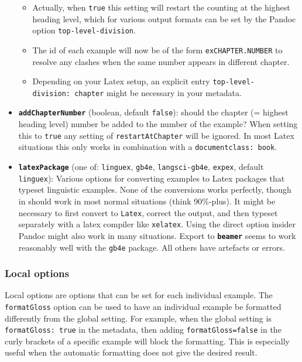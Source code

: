\documentclass[
]{article}
\providecommand{\tightlist}{%
  \setlength{\itemsep}{0pt}\setlength{\parskip}{0pt}}
\begin{document}
\begin{itemize}
  \begin{itemize}
  \tightlist
  \item
    Actually, when \texttt{true} this setting will restart the counting
    at the highest heading level, which for various output formats can
    be set by the Pandoc option \texttt{top-level-division}.
  \item
    The id of each example will now be of the form
    \texttt{exCHAPTER.NUMBER} to resolve any clashes when the same
    number appears in different chapter.
  \item
    Depending on your Latex setup, an explicit entry
    \texttt{top-level-division:\ chapter} might be necessary in your
    metadata.
  \end{itemize}
\item
  \textbf{\texttt{addChapterNumber}} (boolean, default \texttt{false}):
  should the chapter (= highest heading level) number be added to the
  number of the example? When setting this to \texttt{true} any setting
  of \texttt{restartAtChapter} will be ignored. In most Latex situations
  this only works in combination with a \texttt{documentclass:\ book}.
\item
  \textbf{\texttt{latexPackage}} (one of: \texttt{linguex},
  \texttt{gb4e}, \texttt{langsci-gb4e}, \texttt{expex}, default
  \texttt{linguex}): Various options for converting examples to Latex
  packages that typeset linguistic examples. None of the conversions
  works perfectly, though in should work in most normal situations
  (think 90\%-plus). It might be necessary to first convert to
  \texttt{Latex}, correct the output, and then typeset separately with a
  latex compiler like \texttt{xelatex}. Using the direct option insider
  Pandoc might also work in many situations. Export to
  \textbf{\texttt{beamer}} seems to work reasonably well with the
  \texttt{gb4e} package. All others have artefacts or errors.
\end{itemize}

\subsubsection{Local options}\label{local-options}

Local options are options that can be set for each individual example.
The \texttt{formatGloss} option can be used to have an individual
example be formatted differently from the global setting. For example,
when the global setting is \texttt{formatGloss:\ true} in the metadata,
then adding \texttt{formatGloss=false} in the curly brackets of a
specific example will block the formatting. This is especially useful
when the automatic formatting does not give the desired result.
\end{document}
